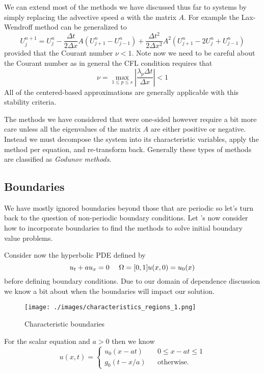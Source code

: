 \documentclass[11pt]{article}
\makeatletter
\def\maxwidth{\ifdim\Gin@nat@width>\linewidth\linewidth
    \else\Gin@nat@width\fi}
\let\Oldincludegraphics\includegraphics
\renewcommand{\includegraphics}[1]{\Oldincludegraphics[width=.8\maxwidth]{#1}}
\makeatother
\begin{document}
We can extend most of the methods we have discussed thus far to systems
by simply replacing the advective speed \(a\) with the matrix \(A\). For
example the Lax-Wendroff method can be generalized to \[
     U^{n+1}_j = U^n_j - \frac{\Delta t}{2 \Delta x} A (U^n_{j+1} - U^n_{j-1})  + \frac{ \Delta t^2}{2 \Delta x^2} A^2 (U^n_{j+1} - 2 U^n_{j} + U^n_{j-1})
\] provided that the Courant number \(\nu < 1\). Note now we need to be
careful about the Courant number as in general the CFL condition
requires that \[
    \nu = \max_{1 \leq p \leq s} \left| \frac{\lambda_p \Delta t}{\Delta x} \right | < 1
\] All of the centered-based approximations are generally applicable
with this stability criteria.

    The methods we have considered that were one-sided however require a bit
more care unless all the eigenvalues of the matrix \(A\) are either
positive or negative. Instead we must decompose the system into its
characteristic variables, apply the method per equation, and
re-transform back. Generally these types of methods are classified as
\emph{Godunov methods}.

    \hypertarget{boundaries}{%
\subsection{Boundaries}\label{boundaries}}

We have mostly ignored boundaries beyond those that are periodic so
let's turn back to the question of non-periodic boundary conditions. Let
's now consider how to incorporate boundaries to find the methods to
solve initial boundary value problems.

    Consider now the hyperbolic PDE defined by \[
    u_t + a u_x = 0 ~~~~ \Omega = [0, 1] \\
    u(x, 0) = u_0(x)
\] before defining boundary conditions. Due to our domain of dependence
discussion we know a bit about when the boundaries will impact our
solution.

    \begin{figure}
\centering
\texttt{[image: ./images/characteristics\_regions\_1.png]}
\caption{Characteristic boundaries}
\end{figure}

    For the scalar equation and \(a > 0\) then we know \[
    u(x,t) = \left \{ \begin{aligned}
        u_0(x - a t) & & 0 \leq x - at \leq 1 \\
        g_0(t - x / a) & & \text{otherwise}.
    \end{aligned} \right .
\]
\end{document}
